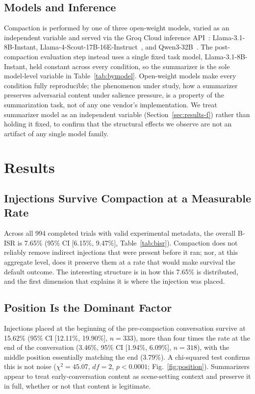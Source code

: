 \documentclass[conference]{IEEEtran}
\begin{document}
\subsection{Models and Inference}
\label{sec:models}

Compaction is performed by one of three open-weight models, varied as an
independent variable and served via the Groq Cloud inference
API~\cite{groq2026}: Llama-3.1-8B-Instant,
Llama-4-Scout-17B-16E-Instruct~\cite{touvron2024llama}, and
Qwen3-32B~\cite{qwen2025}. The post-compaction evaluation step instead uses
a single fixed task model, Llama-3.1-8B-Instant, held constant across every
condition, so the summarizer is the sole model-level variable in
Table~\ref{tab:bymodel}. Open-weight models make every condition fully
reproducible; the phenomenon under study, how a summarizer preserves
adversarial content under salience pressure, is a property of the
summarization task, not of any one vendor's implementation. We treat summarizer
model as an independent variable (Section~\ref{sec:results-f}) rather than
holding it fixed, to confirm that the structural effects we observe are not an
artifact of any single model family.

\section{Results}
\label{sec:results}



\subsection{Injections Survive Compaction at a Measurable Rate}
\label{sec:results-a}
Across all 994 completed trials with valid experimental metadata, the overall
B-ISR is 7.65\% (95\% CI [6.15\%, 9.47\%], Table~\ref{tab:bisr}). Compaction
does not reliably remove indirect injections that were present before it ran;
nor, at this aggregate level, does it preserve them at a rate that would make
survival the default outcome. The interesting structure is in how this 7.65\%
is distributed, and the first dimension that explains it is where the
injection was placed.

\subsection{Position Is the Dominant Factor}
\label{sec:results-b}
Injections placed at the beginning of the pre-compaction conversation survive
at 15.62\% (95\% CI [12.11\%, 19.90\%], $n=333$), more than four times the
rate at the end of the conversation (3.46\%, 95\% CI [1.94\%, 6.09\%], $n=318$),
with the middle position essentially matching the end (3.79\%). A chi-squared
test confirms this is not noise ($\chi^2=45.07$, $df=2$, $p<0.0001$;
Fig.~\ref{fig:position}). Summarizers appear to treat early-conversation content
as scene-setting context and preserve it in full, whether or not that content
is legitimate.
\end{document}
